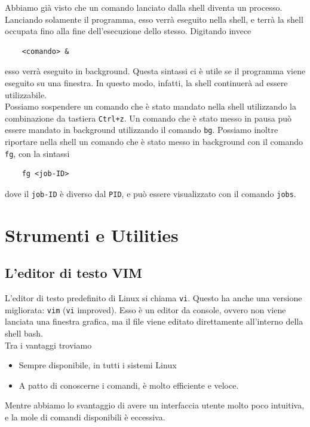 \documentclass[11pt]{book}
\begin{document}
Abbiamo già visto che un comando lanciato dalla shell diventa un processo. Lanciando solamente il programma, esso verrà eseguito nella shell, e terrà la shell occupata fino alla fine dell'esecuzione dello stesso. Digitando invece
\begin{verbatim}
	<comando> &
\end{verbatim}
esso verrà eseguito in background. Questa sintassi ci è utile se il programma viene eseguito su una finestra. In questo modo, infatti, la shell continuerà ad essere utilizzabile. \\
Possiamo sospendere un comando che è stato mandato nella shell utilizzando la combinazione da tastiera \verb*|Ctrl+z|. Un comando che è stato messo in pausa può essere mandato in background utilizzando il comando \verb*|bg|. Possiamo inoltre riportare nella shell un comando che è stato messo in background con il comando \verb*|fg|, con la sintassi
\begin{verbatim}
	fg <job-ID>
\end{verbatim}
dove il \verb*|job-ID| è diverso dal \verb*|PID|, e può essere visualizzato con il comando \verb*|jobs|.

\chapter{Strumenti e Utilities}

\section{L'editor di testo VIM}
L'editor di testo predefinito di Linux si chiama \verb*|vi|. Questo ha anche una versione migliorata: \verb*|vim| (\verb*|vi| improved). Esso è un editor da console, ovvero non viene lanciata una finestra grafica, ma il file viene editato direttamente all'interno della shell bash.\\
Tra i vantaggi troviamo
\begin{itemize}
	\item Sempre disponibile, in tutti i sistemi Linux 
	\item A patto di conoscerne i comandi, è molto efficiente e veloce.
\end{itemize}
Mentre abbiamo lo svantaggio di avere un interfaccia utente molto poco intuitiva, e la mole di comandi disponibili è eccessiva. 
\end{document}
